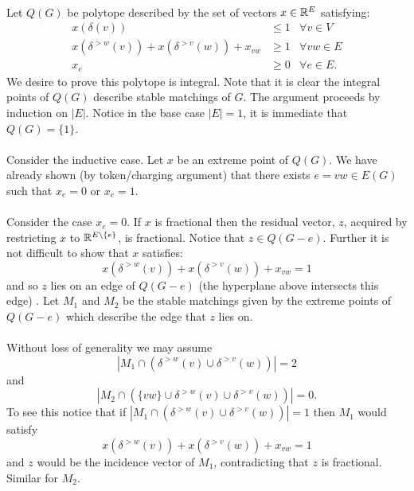 \documentclass[letterpaper,12pt,oneside,onecolumn]{article}
\begin{document}
\paragraph{}
Let $Q(G)$ be polytope described by the set of vectors $x \in \mathbb{R}^E$ satisfying:
\begin{align*}
x(\delta(v)) &\leq 1 &\forall v \in V\\
x(\delta^{>w}(v))+ x(\delta^{>v}(w)) + x_{vw} &\geq 1 &\forall vw \in E \\
x_e &\geq 0 &\forall e \in E.
\end{align*}
We desire to prove this polytope is integral. Note that it is clear the integral points of $Q(G)$ describe stable matchings of $G$. The argument proceeds by induction on $|E|$. Notice in the base case $|E| = 1$, it is immediate that $Q(G) = \{1\}$.
\paragraph{}
Consider the inductive case. Let $x$ be an extreme point of $Q(G)$. We have already shown (by token/charging argument) that there exists $e=vw \in E(G)$ such that $x_e = 0$ or $x_e = 1$. 
\paragraph{}
Consider the case $x_e = 0$. If $x$ is fractional then the residual vector, $z$, acquired by restricting $x$ to $\mathbb{R}^{E\backslash\{e\}}$, is fractional. Notice that $z \in Q(G-e)$. Further it is not difficult to show that $x$ satisfies:
$$x(\delta^{>w}(v))+ x(\delta^{>v}(w)) + x_{vw} = 1$$
and so $z$ lies on an edge of $Q(G-e)$ (the hyperplane above intersects this edge) . Let $M_1$ and $M_2$ be the stable matchings given by the extreme points of $Q(G-e)$ which describe the edge that $z$ lies on.
\paragraph{}
Without loss of generality we may assume
$$ |M_1 \cap(\delta^{>w}(v) \cup \delta^{>v}(w))| = 2 $$
and 
$$ |M_2 \cap(\{vw\} \cup \delta^{>w}(v) \cup \delta^{>v}(w))| = 0.$$
To see this notice that if $|M_1 \cap(\delta^{>w}(v) \cup \delta^{>v}(w))| = 1$ then $M_1$ would satisfy $$x(\delta^{>w}(v))+ x(\delta^{>v}(w)) + x_{vw} = 1$$ and $z$ would be the incidence vector of $M_1$, contradicting that $z$ is fractional. Similar for $M_2$.
\end{document}
